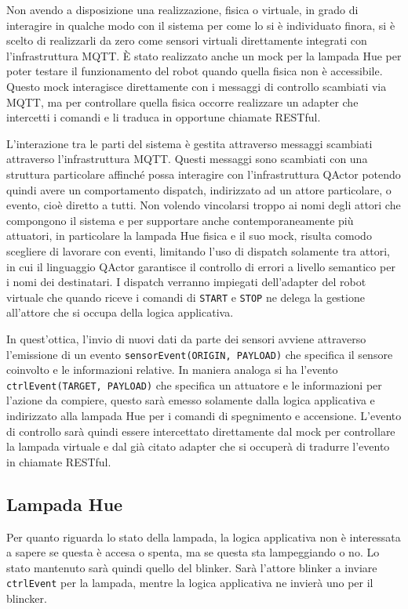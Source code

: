 Non avendo a disposizione una realizzazione, fisica o virtuale, in grado di interagire in qualche modo con il sistema per come lo si è individuato finora, si è scelto di realizzarli da zero come sensori virtuali direttamente integrati con l'infrastruttura MQTT. È stato realizzato anche un mock per la lampada Hue per poter testare il funzionamento del robot quando quella fisica non è accessibile. Questo mock interagisce direttamente con i messaggi di controllo scambiati via MQTT, ma per controllare quella fisica occorre realizzare un adapter che intercetti i comandi e li traduca in opportune chiamate RESTful.

L'interazione tra le parti del sistema è gestita attraverso messaggi scambiati attraverso l'infrastruttura MQTT. Questi messaggi sono scambiati con una struttura particolare affinché possa interagire con l'infrastruttura QActor potendo quindi avere un comportamento dispatch, indirizzato ad un attore particolare, o evento, cioè diretto a tutti. Non volendo vincolarsi troppo ai nomi degli attori che compongono il sistema e per supportare anche contemporaneamente più attuatori, in particolare la lampada Hue fisica e il suo mock, risulta comodo scegliere di lavorare con eventi, limitando l'uso di dispatch solamente tra attori, in cui il linguaggio QActor garantisce il controllo di errori a livello semantico per i nomi dei destinatari. I dispatch verranno impiegati dell'adapter del robot virtuale che quando riceve i comandi di \texttt{START} e \texttt{STOP} ne delega la gestione all'attore che si occupa della logica applicativa.

In quest'ottica, l'invio di nuovi dati da parte dei sensori avviene attraverso l'emissione di un evento \texttt{sensorEvent(ORIGIN, PAYLOAD)} che specifica il sensore coinvolto e le informazioni relative. In maniera analoga si ha l'evento \texttt{ctrlEvent(TARGET, PAYLOAD)} che specifica un attuatore e le informazioni per l'azione da compiere, questo sarà emesso solamente dalla logica applicativa e indirizzato alla lampada Hue per i comandi di spegnimento e accensione. L'evento di controllo sarà quindi essere intercettato direttamente dal mock per controllare la lampada virtuale e dal già citato adapter che si occuperà di tradurre l'evento in chiamate RESTful.

\subsection{Lampada Hue}
Per quanto riguarda lo stato della lampada, la logica applicativa non è interessata a sapere se questa è accesa o spenta, ma se questa sta lampeggiando o no. Lo stato mantenuto sarà quindi quello del blinker. Sarà l'attore blinker a inviare \texttt{ctrlEvent} per la lampada, mentre la logica applicativa ne invierà uno per il blincker.

